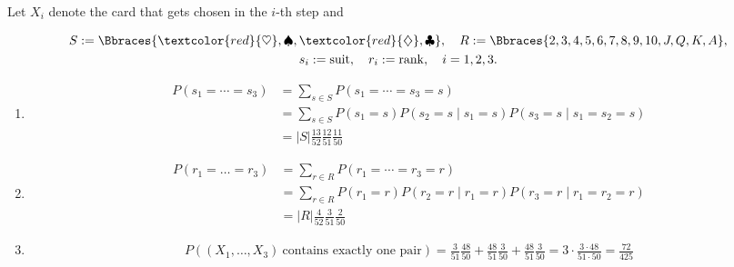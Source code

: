 \begin{solution}

Let $X_i$ denote the card that gets chosen in the $i$-th step and

\begin{gather*}
    S := \Bbraces{\textcolor{red}{\heartsuit}, \spadesuit, \textcolor{red}{\diamondsuit}, \clubsuit},
    \quad
    R := \Bbraces{2, 3, 4, 5, 6, 7, 8, 9, 10, J, Q, K, A}, \\
    s_i := \operatorname{suit},
    \quad
    r_i := \operatorname{rank},
    \quad
    i = 1, 2, 3.
\end{gather*}

\begin{enumerate}[label = (\alph*)]

    \item

    \begin{align*}
        P(s_1 = \cdots = s_3)
        & =
        \sum_{s \in S} P(s_1 = \cdots = s_3 = s) \\
        & =
        \sum_{s \in S} P(s_1 = s) P(s_2 = s \mid s_1 = s) P(s_3 = s \mid s_1 = s_2 = s) \\
        & =
        |S| \frac{13}{52} \frac{12}{51} \frac{11}{50}
    \end{align*}

    \item

    \begin{align*}
        P(r_1 = \dots = r_3)
        & =
        \sum_{r \in R} P(r_1 = \cdots = r_3 = r) \\
        & =
        \sum_{r \in R} P(r_1 = r) P(r_2 = r \mid r_1 = r) P(r_3 = r \mid r_1 = r_2 = r) \\
        & =
        |R| \frac{4}{52} \frac{3}{51} \frac{2}{50}
    \end{align*}

    \item

    \begin{align*}
        P((X_1, \dots, X_3) ~\text{contains exactly one pair})
        =
        \frac{3}{51} \frac{48}{50}
        +
        \frac{48}{51} \frac{3}{50}
        +
        \frac{48}{51} \frac{3}{50}
        =
        3 \cdot \frac{3 \cdot 48}{51 \cdot 50}
        =
        \frac{72}{425}
    \end{align*}

    \begin{center}
        \begin{tikzpicture}


\end{tikzpicture}
\end{center}
\end{enumerate}
\end{solution}
